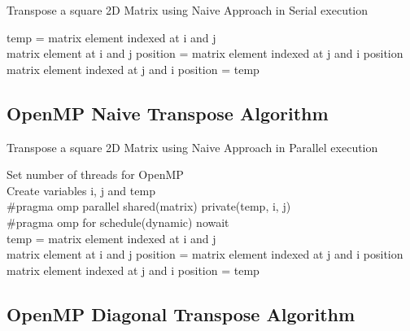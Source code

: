 \documentclass[10pt, onecolumn]{article}
\begin{document}
%
%
\begin{algorithm}[H]
    \label{Alg:BasicAlgorithm}
    \caption{Transpose a square 2D Matrix using Naive Approach in Serial execution}
    {
        {
            temp = matrix element indexed at i and j \\
            matrix element at i and j position = matrix element indexed at j and i position\\
            matrix element indexed at j and i position = temp
        }
    }
\end{algorithm}
%
\subsection{OpenMP Naive Transpose Algorithm}

%
\begin{algorithm}[H]
    \label{Alg:OpenMPNaiveAlgorithm}
    \caption{Transpose a square 2D Matrix using Naive Approach in Parallel execution}
    Set number of threads for OpenMP\\
    Create variables i, j and temp\\
    \#pragma omp parallel shared(matrix) private(temp, i, j)\\
    \#pragma omp for schedule(dynamic) nowait\\
    {
        {
            temp = matrix element indexed at i and j \\
            matrix element at i and j position = matrix element indexed at j and i position \\
            matrix element indexed at j and i position = temp
        }
    }
\end{algorithm}
%
\subsection{OpenMP Diagonal Transpose Algorithm}
\end{document}
